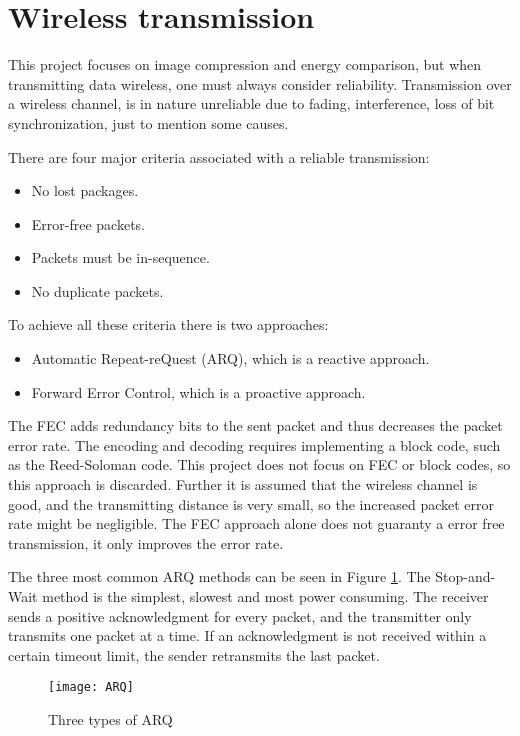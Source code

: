 \section{Wireless transmission}
This project focuses on image compression and energy comparison, but when transmitting data wireless, one must always consider reliability.
Transmission over a wireless channel, is in nature unreliable due to fading, interference, loss of bit synchronization, just to mention some causes.

There are four major criteria associated with a reliable transmission:
\begin{itemize}
\item No lost packages.
\item Error-free packets.
\item Packets must be in-sequence.
\item No duplicate packets.
\end{itemize}
To achieve all these criteria there is two approaches:
\begin{itemize}
\item Automatic Repeat-reQuest (ARQ), which is a reactive approach.
\item Forward Error Control, which is a proactive approach. 
\end{itemize}

The FEC adds redundancy bits to the sent packet and thus decreases the packet error rate. The encoding and decoding requires implementing a block code, such as the Reed-Soloman code. This project does not focus on FEC or block codes, so this approach is discarded. Further it is assumed that the wireless channel is good, and the transmitting distance is very small, so the increased packet error rate might be negligible. The FEC approach alone does not guaranty a error free transmission, it only improves the error rate.

The three most common ARQ methods can be seen in Figure \ref{fig:ARQ}. The Stop-and-Wait method is the simplest, slowest and most power consuming. The receiver sends a positive acknowledgment for every packet, and the transmitter only transmits one packet at a time. If an acknowledgment is not received within a certain timeout limit, the sender retransmits the last packet.

\begin{figure}
\centering
\texttt{[image: ARQ]}
\caption{Three types of ARQ}
\label{fig:ARQ}
\end{figure}

